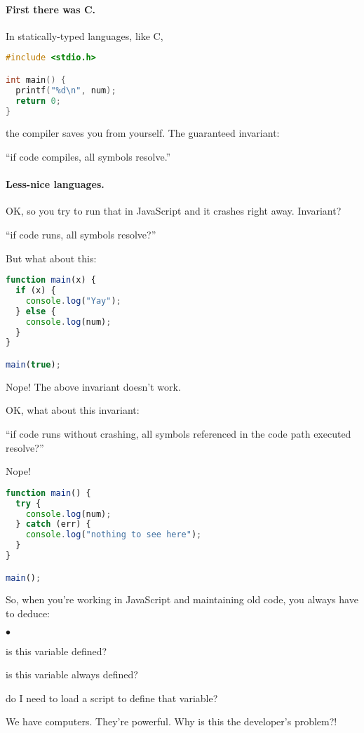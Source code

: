 \documentclass[11pt]{article}
\newcommand{\squishlist}{
 \begin{list}{$\bullet$}
  { \setlength{\itemsep}{0pt}
     \setlength{\parsep}{3pt}
     \setlength{\topsep}{3pt}
     \setlength{\partopsep}{0pt}
     \setlength{\leftmargin}{1.5em}
     \setlength{\labelwidth}{1em}
     \setlength{\labelsep}{0.5em} } }
\newcommand{\squishend}{
  \end{list}  }
\begin{document}
\paragraph{First there was C.}
In statically-typed languages, like C,
\begin{lstlisting}[language=C]
#include <stdio.h>

int main() {
  printf("%d\n", num);
  return 0;
}
\end{lstlisting}
the compiler saves you from yourself.
The guaranteed invariant:
\begin{center}
``if code compiles, all symbols resolve.''
\end{center}

\paragraph{Less-nice languages.}
OK, so you try to run that in JavaScript and it crashes right away.
Invariant?
\begin{center}
 ``if code runs, all symbols resolve?''
\end{center}

But what about this:
\begin{lstlisting}[language=JavaScript]
function main(x) {
  if (x) {
    console.log("Yay");
  } else {
    console.log(num);
  }
}

main(true);
\end{lstlisting}
Nope! The above invariant doesn't work.

OK, what about this invariant:
\begin{center}
``if code runs without crashing, all symbols referenced in the code path executed resolve?''
\end{center}

Nope!
\begin{lstlisting}[language=JavaScript]
function main() {
  try {
    console.log(num);
  } catch (err) {
    console.log("nothing to see here");
  }
}

main();
\end{lstlisting}

So, when you're working in JavaScript and maintaining old code, you always have to
deduce:
\squishlist
\item is this variable defined?
\item is this variable always defined?
\item do I need to load a script to define that variable?
\squishend
We have computers. They're powerful. Why is this the developer's problem?!
\end{document}
